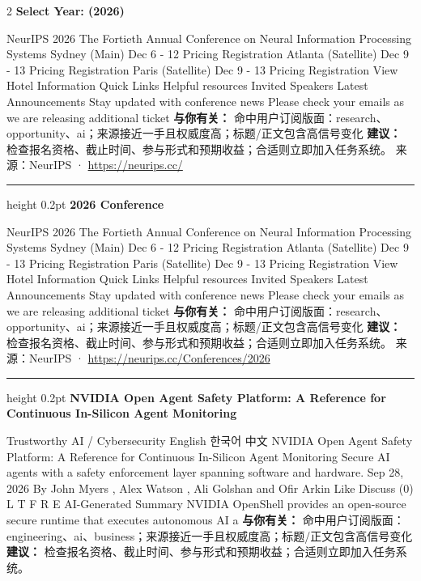 \documentclass[10.5pt]{ctexart}
\begin{document}
\begin{multicols}{2}
{\large\bfseries Select Year: (2026)}\par
NeurIPS 2026 The Fortieth Annual Conference on Neural Information Processing Systems Sydney (Main) Dec 6 - 12 Pricing Registration Atlanta (Satellite) Dec 9 - 13 Pricing Registration Paris (Satellite) Dec 9 - 13 Pricing Registration View Hotel Information Quick Links Helpful resources Invited Speakers Latest Announcements Stay updated with conference news Please check your emails as we are releasing additional ticket
\textbf{与你有关：} 命中用户订阅版面：research、opportunity、ai；来源接近一手且权威度高；标题/正文包含高信号变化
\textbf{建议：} 检查报名资格、截止时间、参与形式和预期收益；合适则立即加入任务系统。
{\footnotesize\color{ormuted} 来源：NeurIPS · \url{https://neurips.cc/}}
\vspace{2mm}
\hrule height 0.2pt
\vspace{2mm}
{\large\bfseries 2026 Conference}\par
NeurIPS 2026 The Fortieth Annual Conference on Neural Information Processing Systems Sydney (Main) Dec 6 - 12 Pricing Registration Atlanta (Satellite) Dec 9 - 13 Pricing Registration Paris (Satellite) Dec 9 - 13 Pricing Registration View Hotel Information Quick Links Helpful resources Invited Speakers Latest Announcements Stay updated with conference news Please check your emails as we are releasing additional ticket
\textbf{与你有关：} 命中用户订阅版面：research、opportunity、ai；来源接近一手且权威度高；标题/正文包含高信号变化
\textbf{建议：} 检查报名资格、截止时间、参与形式和预期收益；合适则立即加入任务系统。
{\footnotesize\color{ormuted} 来源：NeurIPS · \url{https://neurips.cc/Conferences/2026}}
\vspace{2mm}
\hrule height 0.2pt
\vspace{2mm}
{\large\bfseries NVIDIA Open Agent Safety Platform: A Reference for Continuous In-Silicon Agent Monitoring}\par
Trustworthy AI / Cybersecurity English 한국어 中文 NVIDIA Open Agent Safety Platform: A Reference for Continuous In-Silicon Agent Monitoring Secure AI agents with a safety enforcement layer spanning software and hardware. Sep 28, 2026 By John Myers , Alex Watson , Ali Golshan and Ofir Arkin Like Discuss (0) L T F R E AI-Generated Summary NVIDIA OpenShell provides an open-source secure runtime that executes autonomous AI a
\textbf{与你有关：} 命中用户订阅版面：engineering、ai、business；来源接近一手且权威度高；标题/正文包含高信号变化
\textbf{建议：} 检查报名资格、截止时间、参与形式和预期收益；合适则立即加入任务系统。

\end{multicols}
\end{document}
